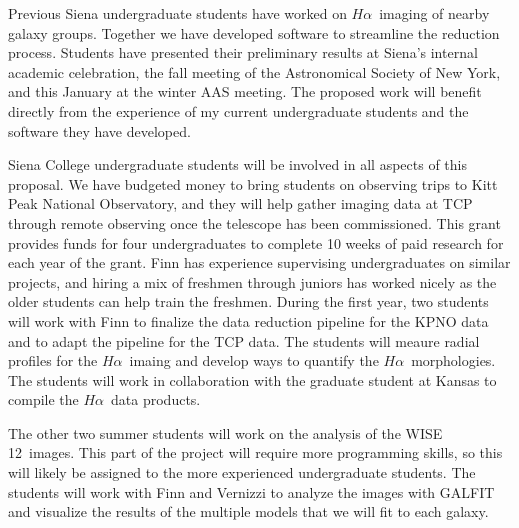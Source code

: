 \documentclass[11pt, preprint]{aastex}
\newcommand{\ha}{$H\alpha$}
\begin{document}
{Previous Siena undergraduate students have worked on \ha \ imaging of
nearby galaxy groups.  Together we have developed software to
streamline the reduction process.  Students have presented their
preliminary results at Siena's internal academic celebration, the fall
meeting of the Astronomical Society of New York, and this January at
the winter AAS meeting.  The proposed  work will benefit directly from
the experience of my current undergraduate students and the software
they have developed.

Siena College undergraduate students will be involved in all aspects
of this proposal.  We have budgeted money to bring students on
observing trips to Kitt Peak National Observatory, and they will help
gather imaging data at TCP through remote observing once the telescope
has been commissioned.  This grant provides funds for four
undergraduates to complete 10 weeks of paid research for each year of
the grant.  Finn has experience supervising undergraduates on similar
projects, and hiring a mix of freshmen through juniors has worked
nicely as the older students can help train the freshmen.  
During the first year, two students will work with Finn to
finalize the data reduction pipeline for the KPNO data and to adapt
the pipeline for the TCP data.  The students will meaure radial
profiles for the \ha \ imaing and develop ways to quantify the \ha \
morphologies.  The students will work in collaboration with the
graduate student at Kansas to compile the \ha \ data products.

The other two summer students will work on the analysis of the WISE
12\micron \ images.  This part of the project will require more
programming skills, so this will likely be assigned to the more
experienced undergraduate students.  The students will work with Finn
and Vernizzi to analyze the images with GALFIT and visualize the
results of the multiple models that we will fit to each galaxy.

}
\end{document}
